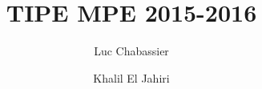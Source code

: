 
\title{TIPE MPE 2015-2016}
\author{Luc Chabassier \and Khalil El Jahiri}
\maketitle

\tableofcontents
\listoftodos

